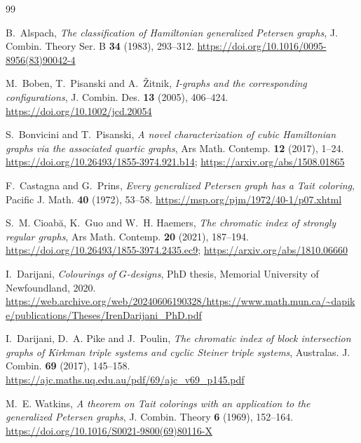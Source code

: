 \documentclass[11pt]{amsart}
\theoremstyle{plain}
\theoremstyle{definition}
\theoremstyle{remark}
\numberwithin{equation}{section}
\begin{document}
\begin{thebibliography}{99}

B.~Alspach, \emph{The classification of Hamiltonian generalized Petersen graphs}, J. Combin. Theory Ser. B \textbf{34} (1983), 293--312.
\url{https://doi.org/10.1016/0095-8956(83)90042-4}

M.~Boben, T.~Pisanski and A.~\v{Z}itnik, \emph{I-graphs and the corresponding configurations}, J. Combin. Des. \textbf{13} (2005), 406--424.
\url{https://doi.org/10.1002/jcd.20054}

S.~Bonvicini and T.~Pisanski, \emph{A novel characterization of cubic Hamiltonian graphs via the associated quartic graphs}, Ars Math. Contemp. \textbf{12} (2017), 1--24.
\url{https://doi.org/10.26493/1855-3974.921.b14};
\url{https://arxiv.org/abs/1508.01865}

F.~Castagna and G.~Prins, \emph{Every generalized Petersen graph has a Tait coloring}, Pacific J. Math. \textbf{40} (1972), 53--58.
\url{https://msp.org/pjm/1972/40-1/p07.xhtml}

S.~M. Cioab\u{a}, K.~Guo and W.~H. Haemers, \emph{The chromatic index of strongly regular graphs}, Ars Math. Contemp. \textbf{20} (2021), 187--194.
\url{https://doi.org/10.26493/1855-3974.2435.ec9};
\url{https://arxiv.org/abs/1810.06660}

I.~Darijani, \emph{Colourings of {$G$}-designs}, PhD thesis, Memorial University of Newfoundland, 2020.
\url{https://web.archive.org/web/20240606190328/https://www.math.mun.ca/~dapike/publications/Theses/IrenDarijani_PhD.pdf}

I.~Darijani, D.~A. Pike and J.~Poulin, \emph{The chromatic index of block intersection graphs of Kirkman triple systems and cyclic Steiner triple systems}, Australas. J. Combin. \textbf{69} (2017), 145--158.
\url{https://ajc.maths.uq.edu.au/pdf/69/ajc_v69_p145.pdf}

M.~E. Watkins, \emph{A theorem on Tait colorings with an application to the generalized Petersen graphs}, J. Combin. Theory \textbf{6} (1969), 152--164.
\url{https://doi.org/10.1016/S0021-9800(69)80116-X}

\end{thebibliography}
\end{document}
